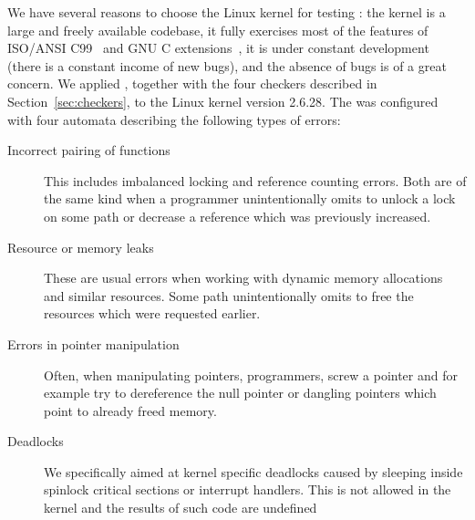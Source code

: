 We have several reasons to choose the Linux kernel for testing \stan: the
kernel is a large and freely available codebase, it fully exercises most
of the features of ISO/ANSI C99~\cite{ansi_c} and GNU C extensions~\cite{gcc},
it is under constant development (there is a constant income of new bugs), and
the absence of bugs is of a great concern.  We applied \stan, together with
the four checkers described in Section~\ref{sec:checkers}, to the Linux kernel
version 2.6.28.  The \AC was configured with four automata describing the
following types of errors:
\begin{description}
\item[Incorrect pairing of functions] This includes imbalanced locking and
  reference counting errors. Both are of the same kind when a programmer
  unintentionally omits to unlock a lock on some path or decrease a reference
  which was previously increased.
\item[Resource or memory leaks] These are usual errors when working with
  dynamic memory allocations and similar resources. Some path unintentionally
  omits to free the resources which were requested earlier.
\item[Errors in pointer manipulation] Often, when manipulating pointers,
  programmers, screw a pointer and for example try to dereference the null
  pointer or dangling pointers which point to already freed memory.
\item[Deadlocks] We specifically aimed at kernel specific deadlocks caused by
  sleeping inside spinlock critical sections or interrupt handlers. This is
  not allowed in the kernel and the results of such code are undefined
\end{description}

